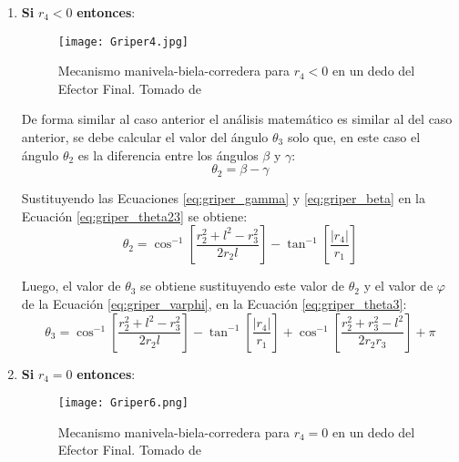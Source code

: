 \begin{enumerate}
\item \textbf{Si} $r_4<0$ \textbf{entonces}:
\begin{figure}[htb]
    \centering
     \texttt{[image: Griper4.jpg]}
    \caption [Mecanismo manivela-biela-corredera para $r_4<0$ en un dedo del Efector Final.]{Mecanismo manivela-biela-corredera para $r_4<0$ en un dedo del Efector Final. Tomado de \cite{zapata_zapata_control_2017} }
    \label{fig:Griper_MBC2}
\end{figure}

De forma similar al caso anterior el análisis matemático es similar al del caso anterior, se debe calcular el valor del ángulo $\theta_3$ solo que, en este caso el ángulo $\theta_2$ es la diferencia entre los ángulos $\beta$ y $\gamma$:
\begin{equation}\label{eq:griper_theta23}
\theta_2=\beta-\gamma
\end{equation}

Sustituyendo las Ecuaciones \ref{eq:griper_gamma} y \ref{eq:griper_beta} en la Ecuación \ref{eq:griper_theta23} se obtiene:
\begin{equation}\label{eq:griper_theta24}
\theta_2=  \cos^{-1}\left[  \frac{r^2_2 +l^2-r^2_3}{2r_2l}\right]- \tan^{-1}\left[  \frac{|r_4|}{r_1}\right]
\end{equation}

Luego, el valor de $\theta_3$ se obtiene sustituyendo este valor de $\theta_2$  y el valor de $\varphi$ de la Ecuación \ref{eq:griper_varphi},  en la Ecuación \ref{eq:griper_theta3}:
\begin{equation}\label{eq:griper_theta34}
\theta_3= \cos^{-1}\left[  \frac{r^2_2 +l^2-r^2_3}{2r_2l}\right]- \tan^{-1}\left[  \frac{|r_4|}{r_1}\right]+\cos^{-1}\left[ \frac{r^2_2 +r^2_3-l^2}{2r_2r_3}\right]+\pi
\end{equation}

\item \textbf{Si} $r_4=0$ \textbf{entonces}:
\begin{figure}[htb]
    \centering
     \texttt{[image: Griper6.png]}
    \caption[Mecanismo manivela-biela-corredera para $r_4 =0$ en un dedo del Efector Final.]{Mecanismo manivela-biela-corredera para $r_4 =0$ en un dedo del Efector Final. Tomado de \cite{zapata_zapata_control_2017} }
    \label{fig:Griper_MBC3}
\end{figure}


\end{enumerate}
